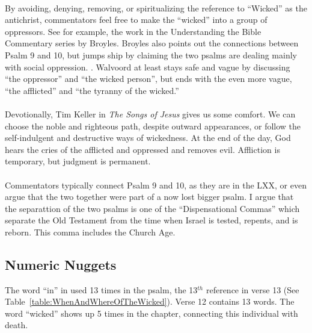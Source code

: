 \\
\noindent By avoiding, denying,  removing, or spiritualizing the reference to ``Wicked'' as the antichrist,  commentators feel free to make the ``wicked'' into a group of oppressors. See for example, the work in the Understanding the Bible Commentary series by Broyles. Broyles also points out the connections between Psalm 9 and 10, but jumps ship by claiming the two psalms are dealing mainly with social oppression. \cite{broyles2012psalms}. Walvoord at least stays safe and vague by discussing ``the oppressor'' and ``the wicked person'', but ends with the even more vague, ``the afflicted'' and ``the tyranny of the wicked.'' \cite{walvoord1985bibleknowledgeOT}\\
\\
Devotionally, Tim Keller in \emph{The Songs of Jesus} gives us some comfort. We can choose the noble and righteous path, despite outward appearances, or follow the self-indulgent and destructive ways of wickedness. At the end of the day, God hears the cries of the afflicted and oppressed and removes evil. Affliction is temporary, but judgment is permanent. \cite{keller2015songs}\\
\\
Commentators typically connect Psalm 9 and 10, as they are in the LXX, or even argue that the two together were part of a now lost bigger psalm. I argue that the separattion of the two psalms is one of the ``Dispensational Commas'' which separate the Old Testament from the time when Israel is tested, repents, and is reborn. This comma includes the Church Age.\cite{wilcock2001MessageOfPsalms1to72}

\subsection{Numeric Nuggets}
The word ``in'' in used 13 times in the psalm, the 13$^{th}$ reference in verse 13 (See Table~\ref{table:WhenAndWhereOfTheWicked}). Verse 12 contains 13 words. The word ``wicked'' shows up 5 times in the chapter, connecting this individual with death.


